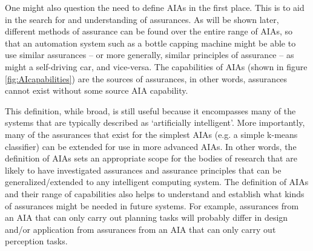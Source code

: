     One might also question the need to define AIAs in the first place. This is to aid in the search for and understanding of assurances. As will be shown later, different methods of assurance can be found over the entire range of AIAs, so that an automation system such as a bottle capping machine might be able to use similar assurances -- or more generally, similar principles of assurance -- as might a self-driving car, and vice-versa. The capabilities of AIAs (shown in figure \ref{fig:AIcapabilities}) are the sources of assurances, in other words, assurances cannot exist without some source AIA capability.

    This definition, while broad, is still useful because it encompasses many of the systems that are typically described as `artificially intelligent'. More importantly, many of the assurances that exist for the simplest AIAs (e.g. a simple k-means classifier) can be extended for use in more advanced AIAs. In other words, the definition of AIAs sets an appropriate scope for the bodies of research that are likely to have investigated assurances and assurance principles that can be generalized/extended to any intelligent computing system. The definition of AIAs and their range of capabilities also helps to understand and establish what kinds of assurances might be needed in future systems. For example, assurances from an AIA that can only carry out planning tasks will probably differ in design and/or application from assurances from an AIA that can only carry out perception tasks. 
